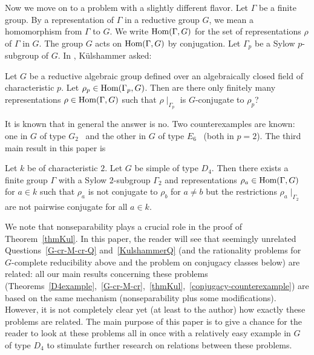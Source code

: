 Now we move on to a problem with a slightly different flavor. Let $\Gamma$ be a finite group. By a representation of $\Gamma$ in a reductive group $G$, we mean a homomorphism from $\Gamma$ to $G$. We write $\textup{Hom}(\Gamma, G)$ for the set of representations $\rho$ of $\Gamma$ in $G$. The group $G$ acts on $\textup{Hom}(\Gamma, G)$ by conjugation. Let $\Gamma_p$ be a Sylow $p$-subgroup of $G$. In \cite[Sec.~2]{Kulshammer-Donovan-Israel}, K\"ulshammer asked: 
\begin{question}\label{KulshammerQ}
Let $G$ be a reductive algebraic group defined over an algebraically closed field of characteristic $p$. Let $\rho_p \in \textup{Hom}(\Gamma_p, G)$. Then are there only finitely many representations $\rho \in \textup{Hom}(\Gamma, G)$ such that $\rho\mid_{\Gamma_p}$ is $G$-conjugate to $\rho_p$? 
\end{question}
It is known that in general the answer is no. Two counterexamples are known: one in $G$ of type $G_2$~\cite{Bate-QuestionOfKulshammer} and the other in $G$ of type $E_6$~\cite[Thm.~1.14]{Uchiyama-Classification-pre} (both in $p=2$). The third main result in this paper is 
\begin{thm}\label{thmKul}
Let $k$ be of characteristic $2$. Let $G$ be simple of type $D_4$. Then there exists a finite group $\Gamma$ with a Sylow $2$-subgroup $\Gamma_2$ and representations $\rho_a\in \textup{Hom}(\Gamma,G)$ for $a\in k$ such that $\rho_a$ is not conjugate to $\rho_b$ for $a\neq b$ but the restrictions $\rho_a\mid_{\Gamma_2}$ are not pairwise conjugate for all $a\in k$. 
\end{thm} 
We note that nonseparability plays a crucial role in the proof of Theorem~\ref{thmKul}. 
In this paper, the reader will see that seemingly unrelated Questions~\ref{G-cr-M-cr-Q} and~\ref{KulshammerQ} (and the rationality problems for $G$-complete reducibility above and the problem on conjugacy classes below) are related: all our main results concerning these problems (Theorems~\ref{D4example},~\ref{G-cr-M-cr},~\ref{thmKul},~\ref{conjugacy-counterexample}) are based on the same mechanism (nonseparability plus some modifications). However, it is not completely clear yet (at least to the author) how exactly these problems are related. The main purpose of this paper is to give a chance for the reader to look at these problems all in once with a relatively easy example in $G$ of type $D_4$ to stimulate further research on relations between these problems.  

